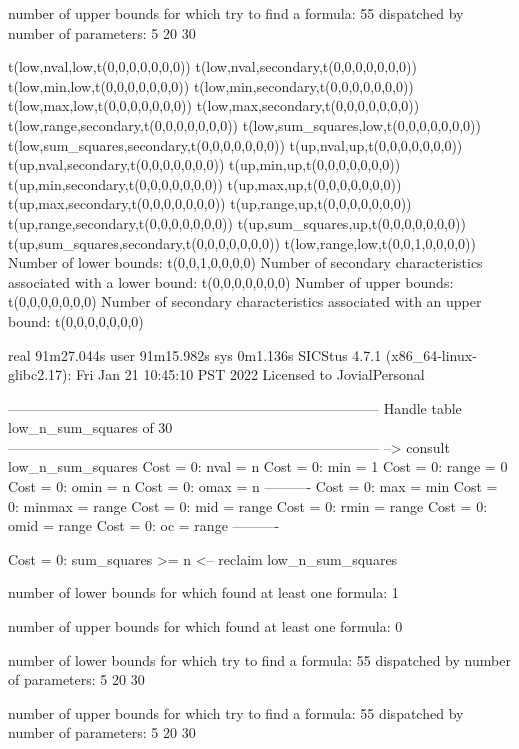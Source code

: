 number of upper bounds for which try to find a formula: 55
dispatched by number of parameters: 5  20  30

t(low,nval,low,t(0,0,0,0,0,0,0))
t(low,nval,secondary,t(0,0,0,0,0,0,0))
t(low,min,low,t(0,0,0,0,0,0,0))
t(low,min,secondary,t(0,0,0,0,0,0,0))
t(low,max,low,t(0,0,0,0,0,0,0))
t(low,max,secondary,t(0,0,0,0,0,0,0))
t(low,range,secondary,t(0,0,0,0,0,0,0))
t(low,sum_squares,low,t(0,0,0,0,0,0,0))
t(low,sum_squares,secondary,t(0,0,0,0,0,0,0))
t(up,nval,up,t(0,0,0,0,0,0,0))
t(up,nval,secondary,t(0,0,0,0,0,0,0))
t(up,min,up,t(0,0,0,0,0,0,0))
t(up,min,secondary,t(0,0,0,0,0,0,0))
t(up,max,up,t(0,0,0,0,0,0,0))
t(up,max,secondary,t(0,0,0,0,0,0,0))
t(up,range,up,t(0,0,0,0,0,0,0))
t(up,range,secondary,t(0,0,0,0,0,0,0))
t(up,sum_squares,up,t(0,0,0,0,0,0,0))
t(up,sum_squares,secondary,t(0,0,0,0,0,0,0))
t(low,range,low,t(0,0,1,0,0,0,0))
Number of lower bounds:                                             t(0,0,1,0,0,0,0)
Number of secondary characteristics associated with a lower bound:  t(0,0,0,0,0,0,0)
Number of upper bounds:                                             t(0,0,0,0,0,0,0)
Number of secondary characteristics associated with an upper bound: t(0,0,0,0,0,0,0)

real	91m27.044s
user	91m15.982s
sys	0m1.136s
SICStus 4.7.1 (x86_64-linux-glibc2.17): Fri Jan 21 10:45:10 PST 2022
Licensed to JovialPersonal


--------------------------------------------------------------------------------
Handle table low_n_sum_squares of 30
--------------------------------------------------------------------------------
--> consult low_n_sum_squares
Cost =  0:  nval   = n
Cost =  0:  min    = 1
Cost =  0:  range  = 0
Cost =  0:  omin   = n
Cost =  0:  omax   = n
----------
Cost =  0:  max    = min
Cost =  0:  minmax = range
Cost =  0:  mid    = range
Cost =  0:  rmin   = range
Cost =  0:  omid   = range
Cost =  0:  oc     = range
----------

Cost =  0:  sum_squares >= n
<-- reclaim low_n_sum_squares

number of lower bounds for which found at least one formula: 1

number of upper bounds for which found at least one formula: 0

number of lower bounds for which try to find a formula: 55
dispatched by number of parameters: 5  20  30

number of upper bounds for which try to find a formula: 55
dispatched by number of parameters: 5  20  30

